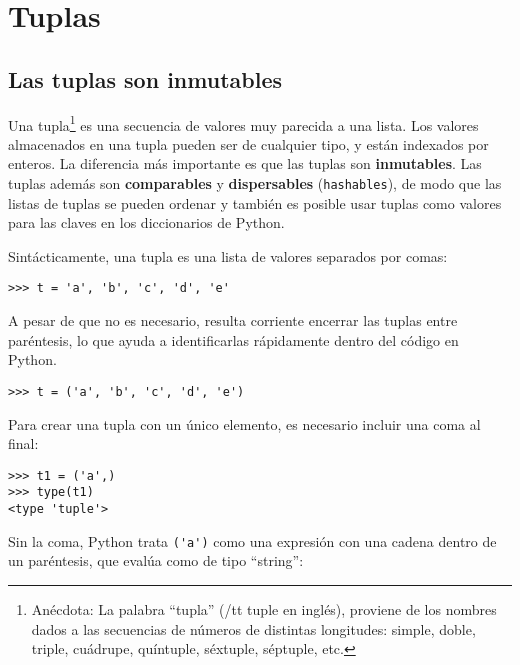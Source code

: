 
\chapter{Tuplas}
\label{tuplechap}

\section{Las tuplas son inmutables}


Una tupla\footnote{Anécdota: La palabra ``tupla'' ({/tt tuple} en inglés), proviene de los nombres
dados a las secuencias de números de distintas longitudes: simple,
doble, triple, cuádrupe, quíntuple, séxtuple, séptuple, etc.}
es una secuencia de valores muy parecida a una lista.
Los valores almacenados en una tupla pueden ser de cualquier tipo, y
están indexados por enteros.
La diferencia más importante es que las tuplas son {\bf inmutables}.
Las tuplas además son {\bf comparables} y {\bf dispersables} ({\tt hashables}), de modo que
las listas de tuplas se pueden ordenar y también es posible usar tuplas
como valores para las claves en los diccionarios de Python.


Sintácticamente, una tupla es una lista de valores separados por comas:

\beforeverb
\begin{verbatim}
>>> t = 'a', 'b', 'c', 'd', 'e'
\end{verbatim}
\afterverb
%
A pesar de que no es necesario, resulta corriente encerrar las tuplas entre
paréntesis, lo que ayuda a identificarlas rápidamente dentro del
código en Python.


\beforeverb
\begin{verbatim}
>>> t = ('a', 'b', 'c', 'd', 'e')
\end{verbatim}
\afterverb
%
Para crear una tupla con un único elemento, es necesario incluir una coma
al final:


\beforeverb
\begin{verbatim}
>>> t1 = ('a',)
>>> type(t1)
<type 'tuple'>
\end{verbatim}
\afterverb
%
Sin la coma, Python trata \verb"('a')" como una expresión con una
cadena dentro de un paréntesis, que evalúa como de tipo ``string'':

